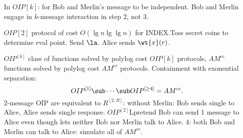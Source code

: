 In $OIP[k]$: for Bob and Merlin's message to be independent. Bob and Merlin engage in $k$-message interaction in step 2, not 3.

$OIP[2]$ protocol of cost $O(\lg n\lg\lg n)$ for INDEX.Toss secret coins to determine eval point. Send $\la$. Alice sends $\wt{x}(r)$.

$OIP^{[k]}$ class of functions solved by polylog cost $OIP[k]$ protocols, $AM^{cc}$ functions solved by polylog cost $AM^{cc}$ protocols. Containment with exonential separation:
\[
OIP^{[1]}\sub \cdots \sub OIP^{[\ge 4]}=AM^{cc}.
\]
2-message OIP are equivalent to $R^{[2,B]}$: without Merlin: Bob sends single to Alice, Alice sends single response. $OIP^{[2]}$Lpretend Bob can send 1 message to Alice even though lets neither Bob nor Merlin talk to Alice. 4: both Bob and Merlin can talk to Alice: simulate all of $AM^{cc}$.

